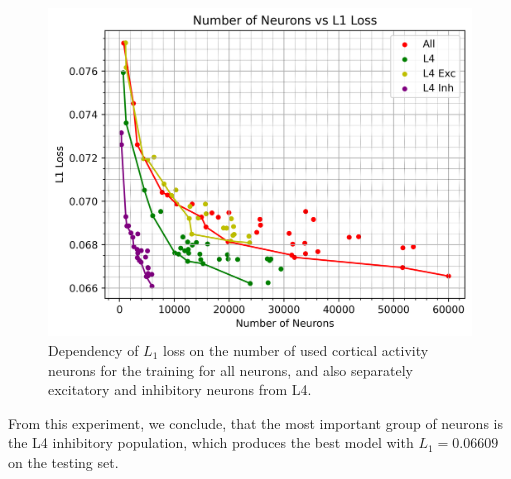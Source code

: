 \begin{figure}[H]\centering
\includegraphics[width=140mm]{img/one-trial/responses_size_l4_groups_one_trial.png}
\caption{Dependency of $L_1$ loss on the number of used cortical activity neurons for the training for all neurons, and also separately excitatory and inhibitory neurons from L4. %
}
\label{img:experiments:one-trial:population-importance:L4}
\end{figure}

From this experiment, we conclude, that the most important group of neurons is the L4 inhibitory population, which produces the best model with $L_1=0.06609$ on the testing set.






